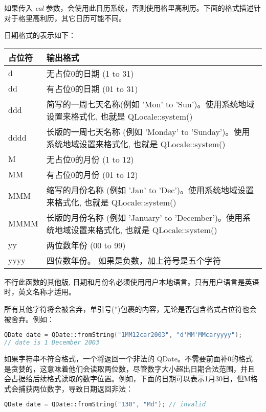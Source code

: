 如果传入 \emph{cal} 参数，会使用此日历系统，否则使用格里高利历。下面的格式描述针对于格里高利历，其它日历可能不同。

日期格式的表示如下：

\begin{tabular}{|l|l|}
\hline
占位符&	输出格式\\
\hline
d&	无占位0的日期 (1 to 31)\\
\hline
dd&	有占位0的日期 (01 to 31)\\
\hline
ddd&	简写的一周七天名称(例如 'Mon' to 'Sun')。使用系统地域设置来格式化, 也就是 QLocale::system()\\
\hline
dddd&	长版的一周七天名称 (例如 'Monday' to 'Sunday')。使用系统地域设置来格式化, 也就是 QLocale::system()\\
\hline
M&	无占位0的月份 (1 to 12)\\
\hline
MM&	有占位0的月份 (01 to 12)\\
\hline
MMM&	缩写的月份名称 (例如 'Jan' to 'Dec')。使用系统地域设置来格式化, 也就是 QLocale::system()\\
\hline
MMMM&	长版的月份名称 (例如 'January' to 'December')。使用系统地域设置来格式化, 也就是 QLocale::system()\\
\hline
yy&	两位数年份 (00 to 99)\\
\hline
yyyy&	四位数年份。 如果是负数，加上符号是五个字符\\
\hline
\end{tabular}

\begin{notice}
 不行此函数的其他版, 日期和月份名必须使用用户本地语言。只有用户语言是英语时，英文名称才适用。
\end{notice}

所有其他字符将会被舍弃，单引号('')包裹的内容，无论是否包含格式占位符也会被舍弃。例如：

\begin{lstlisting}[language=C++]
QDate date = QDate::fromString("1MM12car2003", "d'MM'MMcaryyyy");
// date is 1 December 2003
\end{lstlisting}

如果字符串不符合格式，一个将返回一个非法的 QDate。不需要前面补0的格式
是贪婪的，这意味着他们会读取两位数，尽管数字大小超出日期合法范围，并且
会占据给后续格式读取的数字位置。例如，下面的日期可以表示1月30日，但M格
式会捕获两位数字，导致日期返回非法：

\begin{lstlisting}[language=C++]
QDate date = QDate::fromString("130", "Md"); // invalid
\end{lstlisting}


